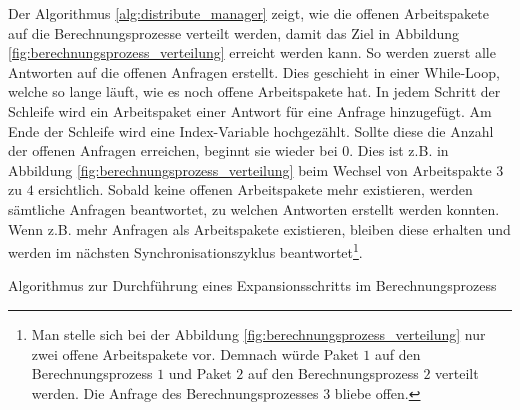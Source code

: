 Der Algorithmus \ref{alg:distribute_manager} zeigt, wie die offenen Arbeitspakete auf die Berechnungsprozesse verteilt
werden, damit das Ziel in Abbildung \ref{fig:berechnungsprozess_verteilung} erreicht werden kann. So werden
zuerst alle Antworten auf die offenen Anfragen erstellt. Dies geschieht in einer \glqq While-Loop\grqq, welche so lange
läuft, wie es noch offene Arbeitspakete hat. In jedem Schritt der Schleife wird ein Arbeitspaket einer Antwort für eine
Anfrage hinzugefügt. Am Ende der Schleife wird eine Index-Variable hochgezählt. Sollte diese die Anzahl der offenen Anfragen
erreichen, beginnt sie wieder bei 0. Dies ist z.B. in Abbildung \ref{fig:berechnungsprozess_verteilung} beim Wechsel von
Arbeitspakte $3$ zu $4$ ersichtlich. Sobald keine offenen Arbeitspakete mehr existieren, werden sämtliche Anfragen
beantwortet, zu welchen Antworten erstellt werden konnten. Wenn z.B. mehr Anfragen als Arbeitspakete existieren, bleiben
diese erhalten und werden im nächsten Synchronisationszyklus beantwortet\footnote{Man stelle sich bei der Abbildung
\ref{fig:berechnungsprozess_verteilung} nur zwei offene Arbeitspakete vor. Demnach würde Paket $1$ auf den Berechnungsprozess
    $1$ und Paket $2$ auf den Berechnungsprozess $2$ verteilt werden. Die Anfrage des Berechnungsprozesses $3$ bliebe offen.}.
\begin{algorithm}[H]
    \DontPrintSemicolon
    \caption{Algorithmus zur Durchführung eines Expansionsschritts im Berechnungsprozess}
    \label{alg:distribute_manager}
\end{algorithm}

